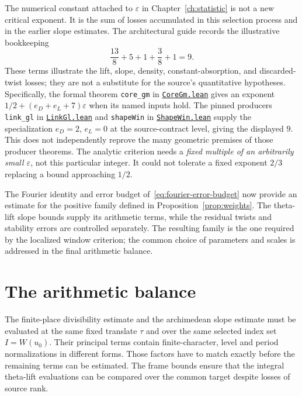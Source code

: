\documentclass[11pt,openany,oneside]{scrbook}
\theoremstyle{definition}
\theoremstyle{remark}
\newcommand{\eps}{\varepsilon}
\newcommand{\baseurl}{https://github.com/CocoSgt/riemann-hypothesis-lean/blob/7cbf7a0c32fca1badf05931879a37c3f8a2b03b4/}
\newcommand{\sourcefile}[2]{\href{\baseurl#1}{\texttt{#2}}}
\begin{document}
The numerical constant attached to $\eps$ in Chapter~\ref{ch:statistic} is not a new critical exponent. It is the sum of losses accumulated in this selection process and in the earlier slope estimates. The architectural guide records the illustrative bookkeeping
\[
\frac{13}{8}+5+1+\frac38+1=9.
\]
These terms illustrate the lift, slope, density, constant-absorption, and discarded-twist losses; they are not a substitute for the source's quantitative hypotheses. Specifically, the formal theorem \texttt{core\_gm} in \sourcefile{src/Development/AutomorphicArithmetic/PrimitiveCosets/CoreGm.lean}{CoreGm.lean} gives an exponent $1/2+(e_D+e_L+7)\eps$ when its named inputs hold. The pinned producers \texttt{link\_gl} in \sourcefile{src/Development/AbelianVarietyTheory/Proofs/GlobalInterpolation/LinkGl.lean}{LinkGl.lean} and \texttt{shapeWin} in \sourcefile{src/Development/AutomorphicArithmetic/CharacterBoxes/ShapeWin.lean}{ShapeWin.lean} supply the specialization $e_D=2$, $e_L=0$ at the source-contract level, giving the displayed $9$. This does not independently reprove the many geometric premises of those producer theorems. The analytic criterion needs a \emph{fixed multiple of an arbitrarily small $\eps$}, not this particular integer. It could not tolerate a fixed exponent $2/3$ replacing a bound approaching $1/2$.

\enlargethispage{4\baselineskip}
The Fourier identity and error budget of~\eqref{eq:fourier-error-budget} now provide an estimate for the positive family defined in Proposition~\ref{prop:weights}. The theta-lift slope bounds supply its arithmetic terms, while the residual twists and stability errors are controlled separately. The resulting family is the one required by the localized window criterion; the common choice of parameters and scales is addressed in the final arithmetic balance.

\chapter{The arithmetic balance}\label{ch:balance}

The finite-place divisibility estimate and the archimedean slope estimate must be evaluated at the same fixed translate $\tau$ and over the same selected index set $I=W(u_0)$. Their principal terms contain finite-character, level and period normalizations in different forms. Those factors have to match exactly before the remaining terms can be estimated. The frame bounds ensure that the integral theta-lift evaluations can be compared over the common target despite losses of source rank.
\end{document}
